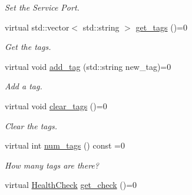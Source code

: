 \begin{DoxyCompactItemize}
\begin{DoxyCompactList}\small\item\em Set the Service Port. \end{DoxyCompactList}\item 
virtual std\+::vector$<$ std\+::string $>$ \hyperlink{classServiceInterface_afdc1ce12ef5ff09cf82e3d0f8ea7724a}{get\+\_\+tags} ()=0\hypertarget{classServiceInterface_afdc1ce12ef5ff09cf82e3d0f8ea7724a}{}\label{classServiceInterface_afdc1ce12ef5ff09cf82e3d0f8ea7724a}

\begin{DoxyCompactList}\small\item\em Get the tags. \end{DoxyCompactList}\item 
virtual void \hyperlink{classServiceInterface_ac8b80c9301fa04ea295acecd88b9cc42}{add\+\_\+tag} (std\+::string new\+\_\+tag)=0\hypertarget{classServiceInterface_ac8b80c9301fa04ea295acecd88b9cc42}{}\label{classServiceInterface_ac8b80c9301fa04ea295acecd88b9cc42}

\begin{DoxyCompactList}\small\item\em Add a tag. \end{DoxyCompactList}\item 
virtual void \hyperlink{classServiceInterface_a3e27c216421be0e92984b07a095f1279}{clear\+\_\+tags} ()=0\hypertarget{classServiceInterface_a3e27c216421be0e92984b07a095f1279}{}\label{classServiceInterface_a3e27c216421be0e92984b07a095f1279}

\begin{DoxyCompactList}\small\item\em Clear the tags. \end{DoxyCompactList}\item 
virtual int \hyperlink{classServiceInterface_aad0434e39242a47048659a1243fab46e}{num\+\_\+tags} () const =0\hypertarget{classServiceInterface_aad0434e39242a47048659a1243fab46e}{}\label{classServiceInterface_aad0434e39242a47048659a1243fab46e}

\begin{DoxyCompactList}\small\item\em How many tags are there? \end{DoxyCompactList}\item 
virtual \hyperlink{structHealthCheck}{Health\+Check} \hyperlink{classServiceInterface_afa5e0a43120dcd89dfcf7ae8aa086217}{get\+\_\+check} ()=0\hypertarget{classServiceInterface_afa5e0a43120dcd89dfcf7ae8aa086217}{}\label{classServiceInterface_afa5e0a43120dcd89dfcf7ae8aa086217}


\end{DoxyCompactItemize}
